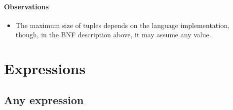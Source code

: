 \documentclass{article}
\begin{document}
    \paragraph{Observations}
    \begin{itemize}
        \item The maximum size of tuples depends on the language implementation, though, in the BNF description
            above, it may assume any value.
    \end{itemize}

\section{Expressions}

    \subsection{Any expression}
\end{document}
